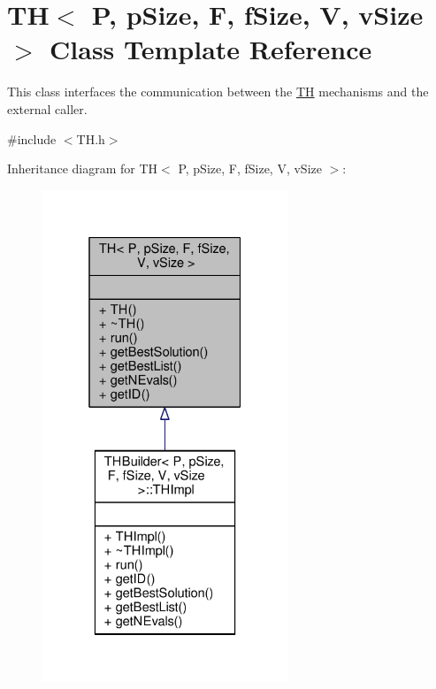 \hypertarget{classTH}{}\section{TH$<$ P, p\+Size, F, f\+Size, V, v\+Size $>$ Class Template Reference}
\label{classTH}


This class interfaces the communication between the \hyperlink{classTH}{TH} mechanisms and the external caller.  




{\ttfamily \#include $<$T\+H.\+h$>$}



Inheritance diagram for TH$<$ P, p\+Size, F, f\+Size, V, v\+Size $>$\+:\nopagebreak
\begin{figure}[H]
\begin{center}
\leavevmode
\includegraphics[width=208pt]{classTH__inherit__graph}
\end{center}
\end{figure}



